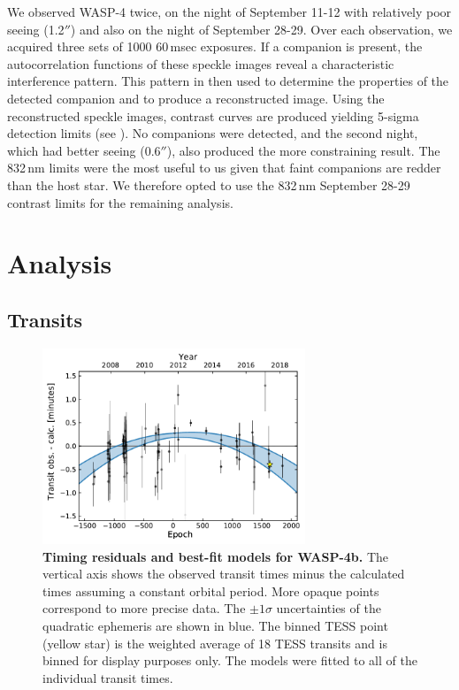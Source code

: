\documentclass[12pt,twocolumn,tighten]{aastex62}
\begin{document}
We observed WASP-4 twice, on the night of September 11-12 with
relatively poor seeing (1.2$''$) and also on the night of September
28-29.  Over each observation, we acquired three sets of 1000
60$\,$msec exposures.  If a companion is present, the autocorrelation
functions of these speckle images reveal a characteristic interference
pattern. This pattern in then used to determine the properties of the
detected companion and to produce a reconstructed image.  Using the
reconstructed speckle images,  contrast curves are produced yielding
5-sigma detection limits  (see \citealt{howell_speckle_2011}).  No
companions were detected, and the second night, which had better
seeing (0.6$''$), also produced the more constraining result.  The
832$\,$nm limits were the most useful to us given that faint
companions are redder than the host star.  We therefore opted to use
the 832$\,$nm September 28-29 contrast limits for the remaining
analysis.


\section{Analysis}
\label{sec:analysis}

\subsection{Transits}
\label{sec:transit_analysis}

\begin{figure}[t]
	\begin{center}
		\leavevmode
		\includegraphics[width=0.7\textwidth]{f1.pdf}
	\end{center}
	\vspace{-0.7cm}
  \caption{ {\bf Timing residuals and best-fit models for WASP-4b.}
  The vertical axis shows the observed transit times minus the
  calculated times assuming a constant orbital period.  More opaque
  points correspond to more precise data.  The $\pm1\sigma$
  uncertainties of the quadratic ephemeris 
  are shown in blue.
  The binned TESS point (yellow star) is the weighted average of 18
  TESS transits and is binned for display purposes only.  The models
  were fitted to all of the individual transit times.
  \label{fig:times}
	}
\end{figure}
\end{document}
